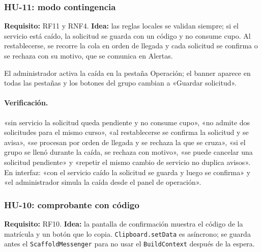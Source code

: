 \subsubsection{HU-11: modo contingencia}
\textbf{Requisito:} RF11 y RNF4. \textbf{Idea:} las reglas locales se validan siempre; si el servicio está caído, la solicitud se guarda con un código y no consume cupo. Al restablecerse, se recorre la cola en orden de llegada y cada solicitud se confirma o se rechaza con su motivo, que se comunica en Alertas.




El administrador activa la caída en la pestaña Operación; el banner aparece en todas las pestañas y los botones del grupo cambian a «Guardar solicitud».



\paragraph{Verificación.} «sin servicio la solicitud queda pendiente y no consume cupo», «no admite dos solicitudes para el mismo curso», «al restablecerse se confirma la solicitud y se avisa», «se procesan por orden de llegada y se rechaza la que se cruza», «si el grupo se llenó durante la caída, se rechaza con motivo», «se puede cancelar una solicitud pendiente» y «repetir el mismo cambio de servicio no duplica avisos». En interfaz: «con el servicio caído la solicitud se guarda y luego se confirma» y «el administrador simula la caída desde el panel de operación».

\subsubsection{HU-10: comprobante con código}
\textbf{Requisito:} RF10. \textbf{Idea:} la pantalla de confirmación muestra el código de la matrícula y un botón que lo copia. \texttt{Clipboard.setData} es asíncrono; se guarda antes el \texttt{ScaffoldMessenger} para no usar el \texttt{BuildContext} después de la espera.

